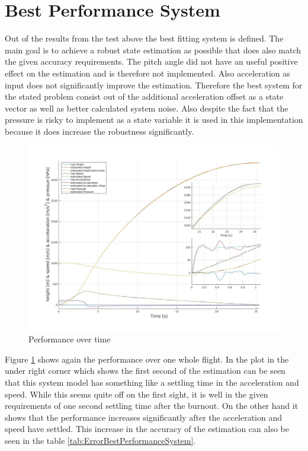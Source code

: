 \section{Best Performance System}
Out of the results from the test above the best fitting system is defined.
The main goal is to achieve a robust state estimation as possible that does also match the given accuracy requirements.
The pitch angle did not have an useful positive effect on the estimation and is therefore not implemented.
Also acceleration as input does not significantly improve the estimation.
Therefore the best system for the stated problem consist out of the additional acceleration offset as a state vector as well as better calculated system noise.
Also despite the fact that the pressure is risky to implement as a state variable it is used in this implementation because it does increase the robustness significantly.

\begin{figure}[h!]
 \centering
 \includegraphics[width=.8\textwidth]{./Pictures/BestSystemPerformance.jpg}
 \caption{Performance over time}
 \label{fig:BestSystemPerformance}
\end{figure}

Figure \ref{fig:BestSystemPerformance} shows again the performance over one whole flight.
In the plot in the under right corner which shows the first second of the estimation can be seen that this system model has something like a settling time in the acceleration and speed.
While this seems quite off on the first sight, it is well in the given requirements of one second settling time after the burnout.
On the other hand it shows that the performance increases significantly after the acceleration and speed have settled.
This increase in the accuracy of the estimation can also be seen in the table \ref{tab:ErrorBestPerformanceSystem}.

